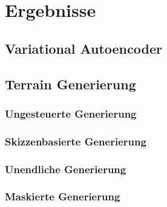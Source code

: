 \chapter{Ergebnisse}


\section {Variational Autoencoder}

\section {Terrain Generierung}
\subsection {Ungesteuerte Generierung}
\subsection {Skizzenbasierte Generierung}
\subsection {Unendliche Generierung}
\subsection {Maskierte Generierung}
